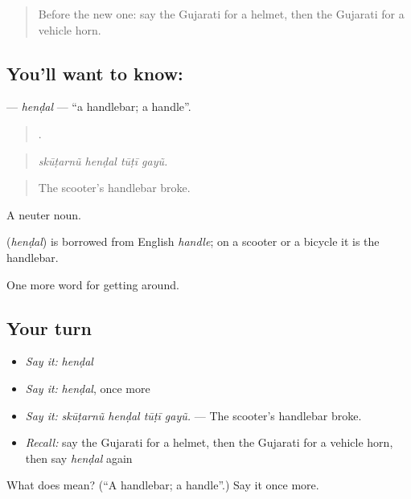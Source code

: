 \begin{quote}
Before the new one: say the Gujarati for a helmet, then the Gujarati for a vehicle horn.
\end{quote}

\subsection*{You'll want to know: }
\textbf{} — \emph{henḍal} — \textquotedblleft{}a handlebar; a handle\textquotedblright{}.

\begin{quote}
   .
\end{quote}

\begin{quote}
\emph{skūṭarnũ henḍal tūṭī gayũ.}
\end{quote}

\begin{quote}
The scooter's handlebar broke.
\end{quote}

A neuter noun.

\begin{cousinweb}
\textbf{} (\emph{henḍal}) is borrowed from English \emph{handle}; on a scooter or a bicycle it is the handlebar.
\end{cousinweb}

\begin{grammarlens}[title={What you've built}]
One more word for getting around.
\end{grammarlens}

\subsection*{Your turn}
\begin{itemize}
\raggedright
  \item \emph{Say it:} \emph{henḍal}
  \item \emph{Say it:} \emph{henḍal}, once more
  \item \emph{Say it:} \emph{skūṭarnũ henḍal tūṭī gayũ.} — The scooter's handlebar broke.
  \item \emph{Recall:} say the Gujarati for a helmet, then the Gujarati for a vehicle horn, then say \emph{henḍal} again
\end{itemize}

\begin{tcolorbox}[breakable,colback=teal!4,colframe=teal!35!black,title={Before you move on}]
What does  mean? (\textquotedblleft{}A handlebar; a handle\textquotedblright{}.) Say it once more.
\end{tcolorbox}
